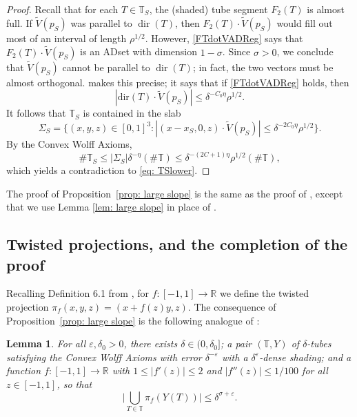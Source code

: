 \documentclass[letterpaper, reqno,11pt]{article}
\numberwithin{equation}{section}
\newcommand{\RR}{\mathbb{R}}
\newcommand{\TT}{\mathbb{T}}
\newcommand{\eps}{\varepsilon}
\newcommand{\tubes}{\mathbb{T}}
\numberwithin{thm}{section}
\newtheorem{lem}[thm]{Lemma}
\theoremstyle{remark}
\begin{document}
\begin{proof}
Recall that for each $T\in\TT_S$, the (shaded) tube segment $F_2(T)$ is almost full. If $\tilde{V}(p_S)$ was parallel to $\operatorname{dir}(T)$, then $F_2(T)\cdot \tilde{V}(p_S)$ would fill out most of an interval of length $\rho^{1/2}$. However, \eqref{FTdotVADReg} says that $F_2(T)\cdot \tilde{V}(p_S)$ is an ADset with dimension $1-\sigma$. Since $\sigma>0$, we conclude that $\tilde{V}(p_S)$ cannot be parallel to $\operatorname{dir}(T)$; in fact, the two vectors must be almost orthogonal. \cite[Lemma 6.2]{WZ} makes this precise; it says that if \eqref{FTdotVADReg} holds, then
\begin{equation}
    |\text{dir}(T)\cdot \tilde{V}(p_S)|\leq \delta^{-C_0\eta} \rho^{1/2}.
\end{equation}
%
It follows that $\TT_S$ is contained in  the slab 
\[
\Sigma_S=\{ (x, y, z)\in [0,1]^3: |(x-x_S, 0, z)\cdot \tilde{V}(p_S)|\leq \delta^{-2C_0\eta} \rho^{1/2} \}.
\]
By the Convex Wolff Axioms,
\[
\#\TT_S \leq |\Sigma_S| \delta^{-\eta} (\#\TT) \leq \delta^{-(2C+1)\eta} \rho^{1/2} (\#\TT),
\]
which yields a contradiction to \eqref{eq: TSlower}.
\end{proof}

The proof of Proposition~\ref{prop: large slope} is the same as the proof of \cite[Proposition 6.1]{WZ}, except that we use Lemma \ref{lem: large slope} in place of \cite[Lemma 6.3]{WZ}.


\subsection{Twisted projections, and the completion of the proof}\label{twistedProjectionsSection}
Recalling Definition 6.1 from \cite{WZ}, for $f\colon [-1,1]\to\RR$ we define the twisted projection $\pi_f(x,y,z) = (x + f(z)y, z)$. The consequence of Proposition~\ref{prop: large slope} is the following analogue of \cite[Corollary 6.5]{WZ}:
%
\begin{lem}\label{L32EstimateLowerBd}
For all $\eps, \delta_0>0$, there exists $\delta\in (0, \delta_0]$; a pair $(\tubes,Y)$ of $\delta$-tubes satisfying the Convex Wolff Axioms with error $\delta^{-\eps}$ with a $\delta^{\eps}$-dense shading; and a function $f\colon [-1,1]\to\RR$ with $1\leq |f'(z)|\leq 2$ and $|f''(z)|\leq 1/100$ for all $z\in [-1,1]$, so that
\begin{equation}
\Big| \bigcup_{T\in\tubes}\pi_f (Y(T))\Big|\leq\delta^{\sigma+\eps}.
\end{equation}
\end{lem}
\end{document}

